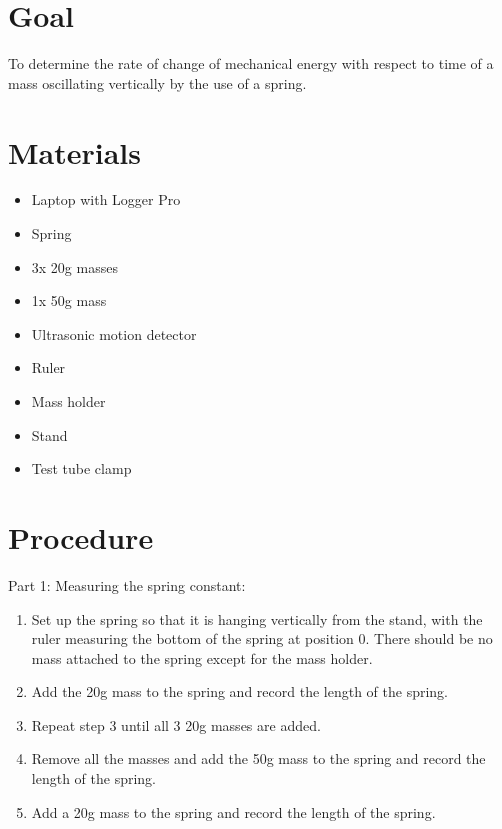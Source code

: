 \documentclass[titlepage]{article}
\begin{document}
    
    \section{Goal}\label{sec:goal}
        To determine the rate of change of mechanical energy with respect to time of a mass oscillating vertically by the use of a spring.
    
    
    \section{Materials}\label{sec:materials}
        \begin{itemize}
            \item Laptop with Logger Pro
            \item Spring
            \item 3x 20g masses
            \item 1x 50g mass
            \item Ultrasonic motion detector
            \item Ruler
            \item Mass holder
            \item Stand
            \item Test tube clamp
        \end{itemize}
    
    
    \section{Procedure}\label{sec:procedure}
        \noindent Part 1: Measuring the spring constant:
        \begin{enumerate}
            \item Set up the spring so that it is hanging vertically from the stand, with the ruler measuring the bottom of the spring at position 0.
            There should be no mass attached to the spring except for the mass holder.
            \item Add the 20g mass to the spring and record the length of the spring.
            \item Repeat step 3 until all 3 20g masses are added.
            \item Remove all the masses and add the 50g mass to the spring and record the length of the spring.
            \item Add a 20g mass to the spring and record the length of the spring.
        \end{enumerate}
        
\end{document}
